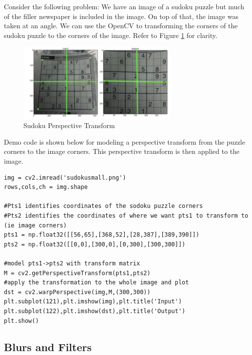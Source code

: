 \documentclass{article}
\begin{document}
Consider the following problem: We have an image of a sudoku puzzle but much of the filler newspaper is included in the image.  On top of that, the image was taken at an angle.  We can use the OpenCV to transforming the corners of the sudoku puzzle to the corners of the image.  Refer to Figure \ref{Sudoku} for clarity.

\begin{figure}[!htbp]
\begin{center}
   \includegraphics[width=8cm]{sudoku.png} 
   \caption{Sudoku Perspective Transform}
   \label{Sudoku}
\end{center}
\end{figure}
\noindent
Demo code is shown below for modeling a perspective transform from the puzzle corners to the image corners.  This perspective transform is then applied to the image.
\begin{lstlisting}
img = cv2.imread('sudokusmall.png')
rows,cols,ch = img.shape

#Pts1 identifies coordinates of the sodoku puzzle corners
#Pts2 identifies the coordinates of where we want pts1 to transform to (ie image corners)
pts1 = np.float32([[56,65],[368,52],[28,387],[389,390]])
pts2 = np.float32([[0,0],[300,0],[0,300],[300,300]])

#model pts1->pts2 with transform matrix
M = cv2.getPerspectiveTransform(pts1,pts2)
#apply the transformation to the whole image and plot
dst = cv2.warpPerspective(img,M,(300,300))
plt.subplot(121),plt.imshow(img),plt.title('Input')
plt.subplot(122),plt.imshow(dst),plt.title('Output')
plt.show()
\end{lstlisting}

\subsection{Blurs and Filters}
\end{document}
